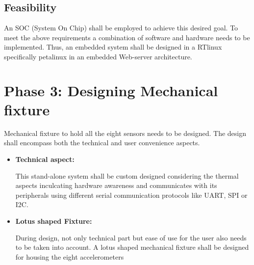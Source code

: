 \documentclass{FR16}
\begin{document}
\subsection{Feasibility}
An SOC (System On Chip) shall be employed to achieve this desired goal.  To meet the above requirements a combination of software and hardware needs to be implemented. Thus, an embedded system shall be designed in a RTlinux specifically petalinux in an embedded Web-server architecture.




\newpage
\section{Phase 3: Designing Mechanical fixture}
Mechanical fixture to hold all the eight sensors needs to be designed. The design shall encompass both the technical and user convenience aspects.
        \begin{itemize}
            \item \textbf{ Technical aspect:} 
            
            This stand-alone system shall be custom designed considering the thermal aspects inculcating   hardware awareness and communicates with its peripherals  using different serial communication protocols like UART, SPI or I2C. 
            
            \item \textbf{ Lotus shaped Fixture:}
            
            During design, not only technical part but ease of use for the user also needs to be taken into account. A lotus shaped mechanical fixture shall be designed for housing the eight accelerometers  
        \end{itemize}



\newpage
\end{document}
